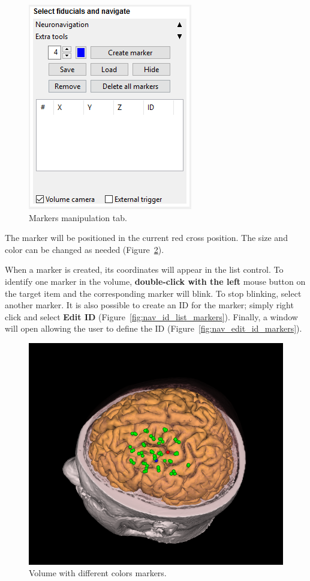 \begin{figure}[!htb]
\centering
\includegraphics[scale=0.6]{../user_guide_figures/invesalius_screen/nav_extra_tools_en.png}
\caption{Markers manipulation tab.}
\label{fig:nav_extra_tools}
\end{figure}

The marker will be positioned in the current red cross position. The size and color can be changed as needed (Figure~\ref{fig:nav_vol_with_markers}).

When a marker is created, its coordinates will appear in the list control. To identify one marker in the volume, \textbf{double-click with the left} mouse button on the target item and the corresponding marker will blink. To stop blinking, select another marker. It is also possible to create an ID for the marker; simply right click and select \textbf{Edit ID} (Figure~\ref{fig:nav_id_list_markers}). Finally, a window will open allowing the user to define the ID (Figure~\ref{fig:nav_edit_id_markers}).

\begin{figure}[!htb]
\centering
\includegraphics[scale=0.4]{../user_guide_figures/invesalius_screen/nav_vol_with_markers.png}
\caption{Volume with different colors markers.}
\label{fig:nav_vol_with_markers}
\end{figure} 

